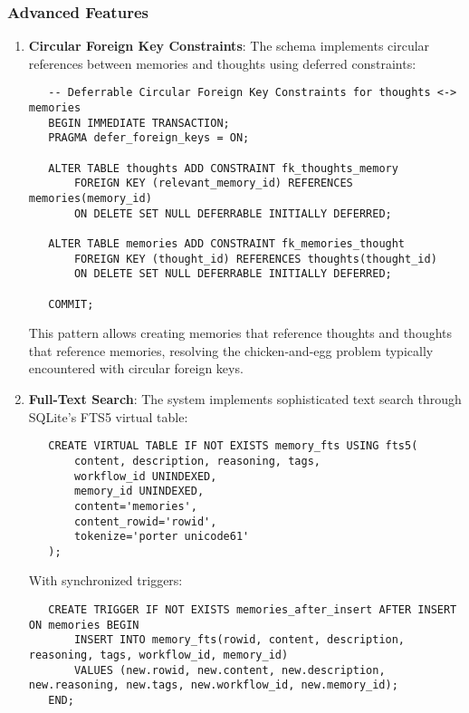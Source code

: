 \documentclass[12pt,a4paper]{article}
\begin{document}
\subsubsection*{Advanced Features}

\begin{enumerate}[label=\arabic*.]
    \item \textbf{Circular Foreign Key Constraints}: The schema implements circular references between memories and thoughts using deferred constraints:
    \begin{pageablecode}
    \begin{verbatim}
   -- Deferrable Circular Foreign Key Constraints for thoughts <-> memories
   BEGIN IMMEDIATE TRANSACTION;
   PRAGMA defer_foreign_keys = ON;

   ALTER TABLE thoughts ADD CONSTRAINT fk_thoughts_memory
       FOREIGN KEY (relevant_memory_id) REFERENCES memories(memory_id)
       ON DELETE SET NULL DEFERRABLE INITIALLY DEFERRED;

   ALTER TABLE memories ADD CONSTRAINT fk_memories_thought
       FOREIGN KEY (thought_id) REFERENCES thoughts(thought_id)
       ON DELETE SET NULL DEFERRABLE INITIALLY DEFERRED;

   COMMIT;
    \end{verbatim}
    \end{pageablecode}
    This pattern allows creating memories that reference thoughts and thoughts that reference memories, resolving the chicken-and-egg problem typically encountered with circular foreign keys.

    \item \textbf{Full-Text Search}: The system implements sophisticated text search through SQLite's FTS5 virtual table:
    \begin{pageablecode}
    \begin{verbatim}
   CREATE VIRTUAL TABLE IF NOT EXISTS memory_fts USING fts5(
       content, description, reasoning, tags,
       workflow_id UNINDEXED,
       memory_id UNINDEXED,
       content='memories',
       content_rowid='rowid',
       tokenize='porter unicode61'
   );
    \end{verbatim}
    \end{pageablecode}
    With synchronized triggers:
    \begin{pageablecode}
    \begin{verbatim}
   CREATE TRIGGER IF NOT EXISTS memories_after_insert AFTER INSERT ON memories BEGIN
       INSERT INTO memory_fts(rowid, content, description, reasoning, tags, workflow_id, memory_id)
       VALUES (new.rowid, new.content, new.description, new.reasoning, new.tags, new.workflow_id, new.memory_id);
   END;
    \end{verbatim}
    \end{pageablecode}


\end{enumerate}
\end{document}

